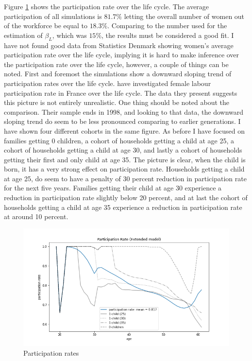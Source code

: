 Figure \ref{fig:ext_model_particpation_rates} shows the participation rate over the life cycle. The average participation of all simulations is $81.7 \%$ letting the overall number of women out of the workforce be equal to $18.3 \%$. Comparing to the number used for the estimation of $\beta_L$, which was $15 \%$, the results must be considered a good fit. I have not found good data from Statistics Denmark showing women's average participation rate over the life cycle, implying it is hard to make inference over the participation rate over the life cycle, however, a couple of things can be noted. First and foremost the simulations show a downward sloping trend of participation rates over the life cycle. \textcite{grimm_labour_2001} have investigated female labour participation rate in France over the life cycle. The data  they present suggests this picture is not entirely unrealistic. One thing should be noted about the comparison. Their sample ends in 1998, and looking to that data, the downward sloping trend do seem to be less pronounced comparing to earlier generations. I have shown four different cohorts in the same figure. As before I have focused on families getting 0 children, a cohort of households getting a child at age 25, a cohort of households getting a child at age 30, and lastly a cohort of households getting their first and only child at age 35. The picture is clear, when the child is born, it has a very strong effect on participation rate. Households getting a child at age 25, do seem to have a penalty of 30 percent reduction in participation rate for the next five years. Families getting their child at age 30 experience a reduction in participation rate slightly below 20 percent, and at last the cohort of households getting a child at age 35 experience a reduction in participation rate at around 10 percent.

\begin{figure}
    \centering
    \includegraphics[scale=0.4]{figures/extended_model_participation_rates.png}
    \caption{Participation rates}
    \label{fig:ext_model_particpation_rates}
\end{figure}


